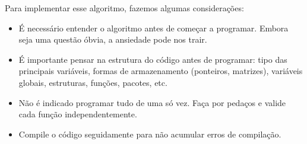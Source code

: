 Para implementar esse algoritmo, fazemos algumas considerações:
\begin{itemize}
 \item É necessário entender o algoritmo antes de começar a programar. Embora seja uma questão óbvia, a ansiedade pode nos trair.
 \item É importante pensar na estrutura do código antes de programar: tipo das principais variáveis, formas de armazenamento (ponteiros, matrizes), variáveis globais, estruturas, funções, pacotes, etc.
 \item Não é indicado programar tudo de uma só vez. Faça por pedaços e valide cada função independentemente. 
 \item Compile o código seguidamente para não acumular erros de compilação.
\end{itemize}


